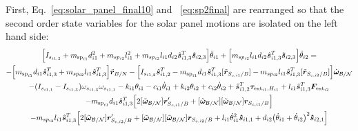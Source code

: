 \documentclass[paper]{aiaaNew}
\begin{document}
	First, Eq.~\eqref{eq:solar_panel_final10} and ~\eqref{eq:sp2final} are rearranged so that the second order state variables for the solar panel motions are isolated on the left hand side:
\begin{multline}
\Big[I_{s_{i1,2}}+ m_{\text{sp}_{i1}} d_{i1}^2 + m_{sp_{i2}} l_{i1}^2 + m_{sp_{i2}} l_{i1} d_{i2} \hat{\bm s}_{i1,3}^T \bm{\hat{s}}_{i2,3} \Big] \ddot\theta_{i1} + \Big[m_{sp_{i2}} l_{i1} d_{i2} \hat{\bm s}_{i1,3}^T \bm{\hat{s}}_{i2,3} \Big] \ddot{\theta}_{i2}=\\
-\Big[m_{\text{sp}_{i1}} d_{i1} \hat{\bm s}_{i1,3}^T + m_{sp_{i2}} l_{i1} \hat{\bm s}_{i1,3}^T \Big] \ddot{\bm{r}}_{B/N} - \Big[I_{s_{i1,2}} \hat{\bm s}_{i1,2}^T - m_{\text{sp}_{i1}} d_{i1} \hat{\bm s}_{i1,3}^T [\tilde{\bm{r}}_{S_{c,i1}/B}] - m_{sp_{i2}} l_{i1} \hat{\bm s}_{i1,3}^T [\tilde{\bm{r}}_{S_{c,i2}/B}] \Big]\dot{\bm\omega}_{\cal B/N} \\
- (I_{s_{i1,1}} - I_{s_{i1,3}}) \omega_{s_{i1,3}} \omega_{s_{i1,1}} - k_{i1} \theta_{i1} - c_{i1}\dot{\theta}_{i1} 
+  k_{i2} \theta_{i2} + c_{i2} \dot\theta_{i2} 
+ \hat{\bm s}_{i1,2}^T \bm \tau_{\text{ext}_{i1},H_{i1}} + l_{i1} \hat{\bm s}_{i1,3}^T \bm F_{\text{ext}_{i2}}\\ 
- m_{\text{sp}_{i1}} d_{i1} \hat{\bm s}_{i1,3}^T \Big[2 [\tilde{\bm\omega}_{\cal B/N}] \bm{r}'_{S_{c,i1}/B}
+ [\tilde{\bm\omega}_{\cal B/N}] [\tilde{\bm\omega}_{\cal B/N}] \bm{r}_{S_{c,i1}/B}\Big]
\\
- m_{sp_{i2}} l_{i1} \hat{\bm s}_{i1,3}^T \Big[ 2 [\tilde{\bm\omega}_{\cal B/N}] \bm{r}'_{S_{c,i2}/B} 
+ [\tilde{\bm\omega}_{\cal B/N}] [\tilde{\bm\omega}_{\cal B/N}] \bm{r}_{S_{c,i2}/B} + l_{i1} \dot{\theta}_{i1}^2 \bm{\hat{s}}_{i1,1} + d_{i2}\big(\dot{\theta}_{i1} + \dot{\theta}_{i2}\big)^2\bm{\hat{s}}_{i2,1}\Big]
\label{eq:spMotion1}
\end{multline}
	
\end{document}
